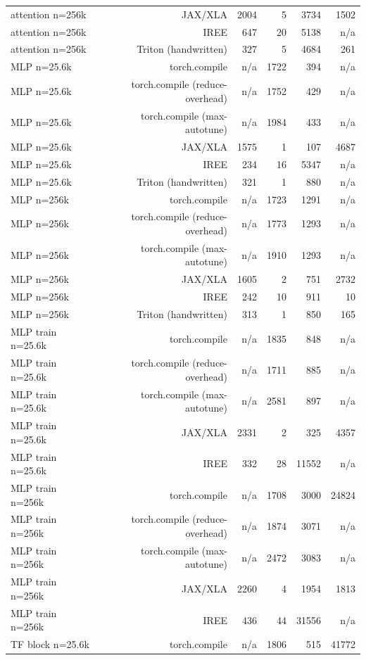 \begin{tabular}{lrrrrr}
attention n=256k & JAX/XLA & 2004 & 5 & 3734 & 1502 \\
attention n=256k & IREE & 647 & 20 & 5138 & n/a \\
attention n=256k & Triton (handwritten) & 327 & 5 & 4684 & 261 \\
MLP n=25.6k & torch.compile & n/a & 1722 & 394 & n/a \\
MLP n=25.6k & torch.compile (reduce-overhead) & n/a & 1752 & 429 & n/a \\
MLP n=25.6k & torch.compile (max-autotune) & n/a & 1984 & 433 & n/a \\
MLP n=25.6k & JAX/XLA & 1575 & 1 & 107 & 4687 \\
MLP n=25.6k & IREE & 234 & 16 & 5347 & n/a \\
MLP n=25.6k & Triton (handwritten) & 321 & 1 & 880 & n/a \\
MLP n=256k & torch.compile & n/a & 1723 & 1291 & n/a \\
MLP n=256k & torch.compile (reduce-overhead) & n/a & 1773 & 1293 & n/a \\
MLP n=256k & torch.compile (max-autotune) & n/a & 1910 & 1293 & n/a \\
MLP n=256k & JAX/XLA & 1605 & 2 & 751 & 2732 \\
MLP n=256k & IREE & 242 & 10 & 911 & 10 \\
MLP n=256k & Triton (handwritten) & 313 & 1 & 850 & 165 \\
MLP train n=25.6k & torch.compile & n/a & 1835 & 848 & n/a \\
MLP train n=25.6k & torch.compile (reduce-overhead) & n/a & 1711 & 885 & n/a \\
MLP train n=25.6k & torch.compile (max-autotune) & n/a & 2581 & 897 & n/a \\
MLP train n=25.6k & JAX/XLA & 2331 & 2 & 325 & 4357 \\
MLP train n=25.6k & IREE & 332 & 28 & 11552 & n/a \\
MLP train n=256k & torch.compile & n/a & 1708 & 3000 & 24824 \\
MLP train n=256k & torch.compile (reduce-overhead) & n/a & 1874 & 3071 & n/a \\
MLP train n=256k & torch.compile (max-autotune) & n/a & 2472 & 3083 & n/a \\
MLP train n=256k & JAX/XLA & 2260 & 4 & 1954 & 1813 \\
MLP train n=256k & IREE & 436 & 44 & 31556 & n/a \\
TF block n=25.6k & torch.compile & n/a & 1806 & 515 & 41772 \\

\end{tabular}
